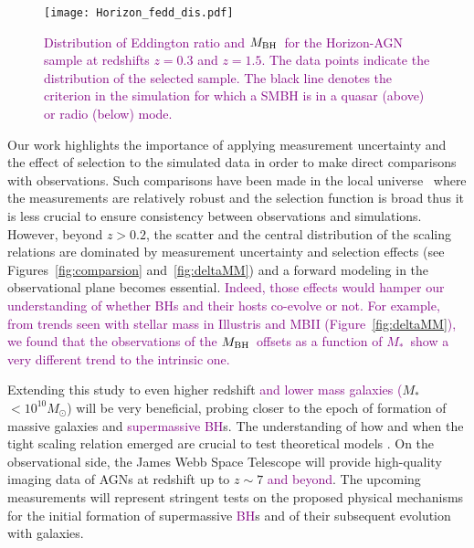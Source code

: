 \documentclass[twocolumn]{aastex631}
\newcommand{\red}[1]{\textcolor{purple}{#1}}
\def\smass{{$M_*$}}
\def\mbh{$M_{\rm BH}$}
\begin{document}

\begin{figure}
\centering
\texttt{[image: Horizon\_fedd\_dis.pdf]}\\
\caption{\label{fig:fedd} 
\red{Distribution of Eddington ratio and \mbh\ for the Horizon-AGN sample at redshifts $z=0.3$ and $z=1.5$. The data points indicate the distribution of the selected sample. The black line denotes the criterion in the simulation for which a SMBH is in a quasar (above) or radio (below) mode.}}
\end{figure} 

Our work highlights the importance of applying measurement uncertainty and the effect of selection to the simulated data in order to make direct comparisons with observations. Such comparisons have been made in the local universe~\citep[e.g.,][]{Habouzit2021} where the measurements are relatively robust and the selection function is broad thus it is less crucial to ensure consistency between observations and simulations. However, beyond $z>0.2$, the scatter and the central distribution of the scaling relations are dominated by measurement uncertainty and selection effects (see Figures~\ref{fig:comparsion} and~\ref{fig:deltaMM}) and a forward modeling in the observational plane becomes essential. \red{Indeed, those effects would hamper our understanding of whether BHs and their hosts co-evolve or not. For example, from trends seen with stellar mass in Illustris and MBII (Figure~\ref{fig:deltaMM}), we found that the observations of the \mbh\ offsets as a function of \smass\  show a very different trend to the intrinsic one.}


Extending this study to even higher redshift \red{and lower mass galaxies (}\smass\ $<10^{10}M_{\odot}$) will be very beneficial, probing closer to the epoch of formation of massive galaxies and \red{supermassive BH}s. The understanding of how and when the tight scaling relation emerged are crucial to test theoretical models \citep{Volonteri2021}. On the observational side, the James Webb Space Telescope will provide high-quality imaging data of AGNs at redshift up to $z\sim7$ \red{and beyond}. The upcoming measurements will represent stringent tests on the proposed physical mechanisms for the initial formation of supermassive \red{BH}s and of their subsequent evolution with galaxies.
\end{document}
